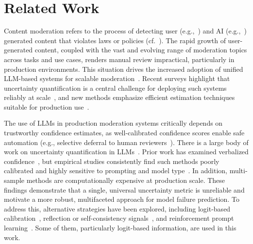 \section{Related Work}
Content moderation refers to the process of detecting user (e.g.,~\cite{gorwa+al:20, kumar+al:24, kolla+al:24}) and AI (e.g.,~\cite{zellers+al:19, lloyd+al:23, fisher+al:24}) generated content that violates laws or policies (cf.~\cite{gorwa+al:20, grimmelmann:15}). The rapid growth of user-generated content, coupled with the vast and evolving range of moderation topics across tasks and use cases, renders manual review impractical, particularly in production environments. This situation drives the increased adoption of unified LLM-based systems for scalable moderation~\cite{kumar+al:24, kolla+al:24, huang:25, levi+al:25}. Recent surveys highlight that uncertainty quantification is a central challenge for deploying such systems reliably at scale~\cite{shorinwa2025surveyuncertaintyquantificationlarge}, and new methods emphasize efficient estimation techniques suitable for production use~\cite{efficient-and-effective}.


The use of LLMs in production moderation systems critically depends on trustworthy confidence estimates, as well-calibrated confidence scores enable safe automation (e.g., selective deferral to human reviewers~\cite{jung+al:24, mozannar2021consistentestimatorslearningdefer}). There is a large body of work on uncertainty quantification in LLMs~\cite{tian+al:23, kadavath+al:22, lin+al:22, kuhn+:23, xiong+al:23, jiang+al:21, manakul+al:23, zhang+al:22, shorinwa2025surveyuncertaintyquantificationlarge,barshalom2025tokenprobabilitieslearnablefast, watson2023explaining, kendall+al:17, farr+al:25, kapoor2024large, cohen2024i, efficient-and-effective, liu+al:24}. Prior work has examined verbalized confidence~\cite{tian+al:23, kadavath+al:22, lin+al:22, xiong+al:23}, but empirical studies consistently find such methods poorly calibrated and highly sensitive to prompting and model type~\cite{kuhn+:23, xiong+al:23}. In addition, multi-sample methods are computationally expensive at production scale. These findings demonstrate that a single, universal uncertainty metric is unreliable and motivate a more robust, multifaceted approach for model failure prediction. To address this, alternative strategies have been explored, including logit-based calibration~\cite{jiang+al:21}, reflection or self-consistency signals~\cite{manakul+al:23}, and reinforcement prompt learning~\cite{zhang+al:22}. Some of them, particularly logit-based information, are used in this work. 

